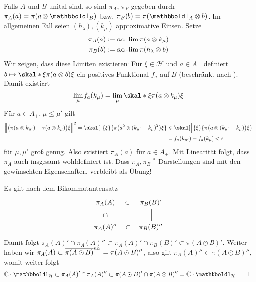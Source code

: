 \begin{beweis}
	Falls $A$ und $B$ unital sind, so sind $\pi_A$, $\pi_B$ gegeben durch $\pi_A(a) = \pi(a \otimes \ind_B)$ bzw. $\pi_B(b) = \pi(\ind_A \otimes b)$.
	Im allgemeinen Fall seien $(h_\lambda), (k_\mu)$ approximative Einsen.
	Setze 
	\begin{align}
		\pi_A(a) &:= \mathrm{\mkern.3mu s\mkern-1.4mu.\mkern-.6mu o\mkern-1.7mu.}\text{-}\mkern-0.8mu\lim \pi(a \otimes k_\mu) \\
		\pi_B(b) &:= \mathrm{\mkern.3mu s\mkern-1.4mu.\mkern-.6mu o\mkern-1.7mu.}\text{-}\mkern-0.8mu\lim \pi(h_\lambda \otimes b)
	\end{align}
	Wir zeigen, dass diese Limiten existieren:
	Für $\xi \in \mathcal{H}$ und $a \in A_+$ definiert $b \mapsto \skal*{\xi}{\pi(a \otimes b) \xi}$ ein positives Funktional $f_a$ auf $B$ (beschränkt nach \cite[Satz 5.3]{OpAlg}).
	Damit existiert
	\[
		\lim_\mu f_a(k_\mu) = \lim_\mu \skal*{\xi}{\pi(a \otimes k_\mu)\xi}
	\]
	Für $a \in A_+$, $\mu \le \mu'$ gilt 
	\begin{align}
		\norm[\Big]{\enbrace[\big]{\pi(a \otimes k_{\mu'}) - \pi (a \otimes k_\mu)}\xi}^2 = \skal[\Big]{\xi}{\pi \enbrace[\big]{a^2 \otimes \enbrace*{k_{\mu'} - k_\mu}^2} \xi}
		&\le \skal[\Big]{\xi}{ \pi \enbrace[\big]{a \otimes \enbrace*{k_{\mu'}- k_\mu}} \xi} \\
		&= f_a(k_{\mu'}) - f_a(k_\mu) < \varepsilon
	\end{align}
	für $\mu, \mu'$ groß genug.
	Also existiert $\pi_A(a)$ für $a \in A_+$. 
	Mit Linearität folgt, dass $\pi_A$ auch insgesamt wohldefiniert ist.
	Dass $\pi_A, \pi_B$ $^*$-Darstellungen sind mit den gewünschten Eigenschaften, verbleibt als Übung!
	
	Es gilt nach dem Bikommutantensatz
	\[
		\begin{tikzcd}
			\pi_A(A)\dar[phantom,"\subset", sloped] \rar[phantom,"\subset", sloped] & \pi_B(B)' \dar[equals] \\
			\pi_A(A)'' \rar[phantom,"\subset", sloped] & \pi_B(B)''
		\end{tikzcd}
	\]
	Damit folgt $\pi_A(A)' \cap \pi_A(A)'' \subset \pi_A(A)' \cap \pi_B(B)' \subset \pi(A \odot B)'$.
	Weiter haben wir $\pi_A(A) \subset \overline{\pi(A \odot B)}^{\mathrm{\mkern.3mu s\mkern-1.4mu.\mkern-.6mu o\mkern-1.7mu.}} = \pi(A \odot B)''$, also gilt $\pi_A(A)'' \subset \pi(A \odot B)''$, womit weiter folgt
	\[
		\mathbb{C} \cdot \ind_{\mathcal{H}} \subset \pi_A(A)' \cap \pi_A(A)'' \subset \pi(A \odot B)' \cap \pi(A \odot B)'' = \mathbb{C} \cdot \ind_{\mathcal{H}}\qedhere
	\]
\end{beweis}

